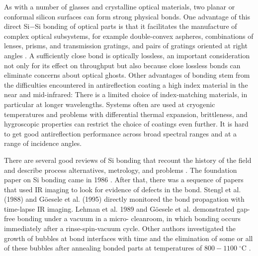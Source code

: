 \documentclass[osajnl,twocolumn,showpacs,superscriptaddress,11pt]{revtex4-1} %
\begin{document}
As with a number of glasses and crystalline optical materials, two planar or conformal silicon surfaces can form strong physical bonds.  One advantage of this direct Si$-$Si bonding of optical parts is that it facilitates the manufacture of complex optical subsystems, for example double-convex aspheres, combinations of lenses, prisms, and transmission gratings, and pairs of gratings oriented at right angles \cite{2012SPIE.8450E..2TV, 2010SPIE.7739E.123G}.  A sufficiently close bond is optically lossless, an important consideration not only for its effect on throughput but also because close lossless bonds can eliminate concerns about optical ghosts. Other advantages of bonding stem from the difficulties encountered in antireflection coating a high index material in the near and mid-infrared:  There is a limited choice of index-matching materials, in particular at longer wavelengths.  Systems often are used at cryogenic temperatures and problems with differential thermal expansion, brittleness, and hygroscopic properties can restrict the choice of coatings even further. It is hard to get good antireflection performance across broad spectral ranges and at a range of incidence angles.


There are several good reviews of Si bonding that recount the history of the field and describe process alternatives, metrology, and problems \cite{1998AnRMS..28..215G,Masteika2014}.  The foundation paper on Si bonding came in 1986 \cite{1986JAP....60.2987S}. After that, there was a sequence of papers that used IR imaging to look for evidence of defects in the bond. Stengl et al. (1988) and G{\"o}esele et al. (1995) \cite{1988JaJAP..27L2364S, 1995ApPhL..67.3614G} directly monitored the bond propagation with time-lapse IR imaging. Lehman et al. 1989 and G{\"o}esele et al. \cite{1989JaJAP..28L2141L, 1995ApPhL..67.3614G} demonstrated gap-free bonding under a vacuum in a micro- cleanroom, in which bonding occurs immediately after a rinse-spin-vacuum cycle.  Other authors investigated the growth of bubbles at bond interfaces with time and the elimination of some or all of these bubbles after annealing bonded parts at temperatures of $800-1100\;^\circ$C \cite{Horn2009, Masteika2014}.
\end{document}
